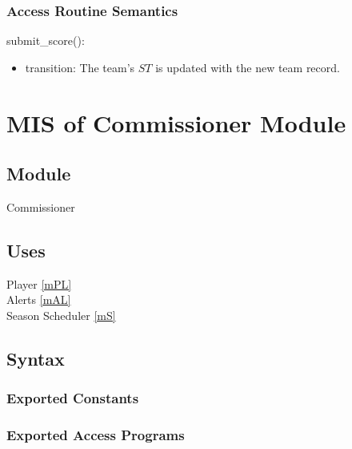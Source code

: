 \documentclass[12pt, titlepage]{article}
\begin{document}

\subsubsection{Access Routine Semantics}

\noindent submit\_score():
\begin{itemize}
\item transition: The team's $ST$ is updated with the new team record.
\end{itemize}

\newpage

\section{MIS of Commissioner Module} \label{mCM}



\subsection{Module}

Commissioner

\subsection{Uses}

Player \ref{mPL}\\
Alerts \ref{mAL}\\
Season Scheduler \ref{mS}

\subsection{Syntax}

\subsubsection{Exported Constants}

\subsubsection{Exported Access Programs}
\end{document}
